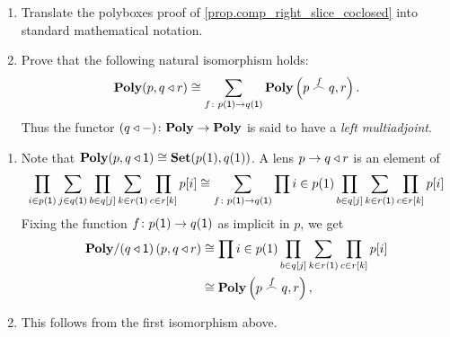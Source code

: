 \documentclass[Book-Poly]{subfiles}
\begin{document}
\begin{exercise} \label{exc.comp_right_slice_coclosed_calc}
\begin{enumerate}
    \item Translate the polyboxes proof of \cref{prop.comp_right_slice_coclosed} into standard mathematical notation.
    \item Prove that the following natural isomorphism holds:
    \begin{equation}
        \mathbf{Poly}(p,q\mathbin{\triangleleft} r)\cong\sum_{f\colon p(\textsf{1})\to q(\textsf{1})}\mathbf{Poly}\left(p\overset{f}{\frown}q,r\right).
    \end{equation}
    Thus the functor $(q\mathbin{\triangleleft}-)\colon\mathbf{Poly}\to\mathbf{Poly}$ is said to have a \emph{left multiadjoint}.
\end{enumerate}
\begin{solution}
\begin{enumerate}
	\item Note that $\mathbf{Poly}(p,q\mathbin{\triangleleft} \textsf{1})\cong\mathbf{Set}(p(1),q(1))$. A lens $p\to q\mathbin{\triangleleft} r$ is an element of
    \[
    \prod_{i\in p(\textsf{1})}\sum_{j\in q(\textsf{1})}\prod_{b\in q[j]}\sum_{k\in r(\textsf{1})}\prod_{c\in r[k]}p[i]\cong\sum_{f\colon p(\textsf{1})\to q(\textsf{1})}\prod{i\in p(1)}\prod_{b\in q[j]}\sum_{k\in r(\textsf{1})}\prod_{c\in r[k]}p[i]
    \]
    Fixing the function $f\colon p(\textsf{1})\to q(\textsf{1})$ as implicit in $p$, we get
\begin{align*}
	\mathbf{Poly}/(q\mathbin{\triangleleft}\textsf{1})\left(p, q\mathbin{\triangleleft} r\right)&\cong
	\prod{i\in p(1)}\prod_{b\in q[j]}\sum_{k\in r(\textsf{1})}\prod_{c\in r[k]}p[i]\\&\cong
	\mathbf{Poly}\left(p\overset{f}{\frown}q, r\right),
\end{align*}
	\item This follows from the first isomorphism above.
 \end{enumerate}
\end{solution}
\end{exercise}
\end{document}
